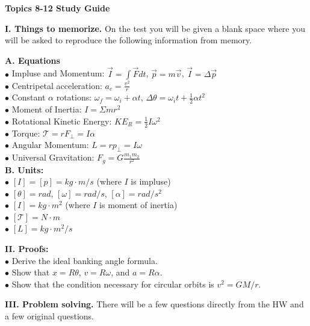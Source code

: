 \documentclass[11pt]{article}
\begin{document}
{\centering
\textbf{Topics 8-12 Study Guide} \par
\vspace{\baselineskip}
}

\textbf{I. Things to memorize.}
On the test you will be given a blank space where you will be asked to reproduce the following information from memory.
\vspace{0.5\baselineskip}

\begin{addmargin}[1em]{0em}%
\textbf{A. Equations} \\
$\bullet$ Impluse and Momentum: $\vec{I} = \int \vec{F} dt$, $\vec{p} = m\vec{v}$, $\vec{I} = \Delta \vec{p}$ \\
$\bullet$ Centripetal acceleration: $a_c = \frac{v^2}{r}$ \\
$\bullet$ Constant $\alpha$ rotations: $\omega_f = \omega_i + \alpha t$, $\Delta \theta = \omega_i t + \frac{1}{2} \alpha t^2$ \\
$\bullet$ Moment of Inertia: $I = \Sigma m r^2$ \\
$\bullet$ Rotational Kinetic Energy: $KE_R = \frac{1}{2} I \omega^2$ \\
$\bullet$ Torque: $\mathcal{T} = rF_\perp = I \alpha$ \\
$\bullet$ Angular Momentum: $L = rp_\perp = I \omega$ \\
$\bullet$ Universal Gravitation: $F_g = G \frac{m_1 m_2}{r^2}$ \\

\textbf{B. Units:} \\
$\bullet$ $\left[ I \right] = \left[ p \right] = kg \cdot m/s$ (where $I$ is impluse) \\
$\bullet$ $\left[ \theta \right] = rad$, $\left[ \omega \right] = rad/s$, $\left[ \alpha \right] = rad/s^2$ \\
$\bullet$ $\left[ I \right] = kg \cdot m^2$ (where $I$ is moment of inertia) \\
$\bullet$ $\left[ \mathcal{T} \right] = N \cdot m$ \\
$\bullet$ $\left[ L \right] = kg \cdot m^2/s$

\end{addmargin}

\vspace{\baselineskip}
\textbf{II. Proofs:} \\
$\bullet$ Derive the ideal banking angle formula. \\
$\bullet$ Show that $x = R\theta$, $v = R\omega$, and $a = R\alpha$. \\
$\bullet$ Show that the condition necessary for circular orbits is $v^2 = GM/r$.

\vspace{\baselineskip}
\textbf{III. Problem solving.}
There will be a few questions directly from the HW and a few original questions.
\end{document}
